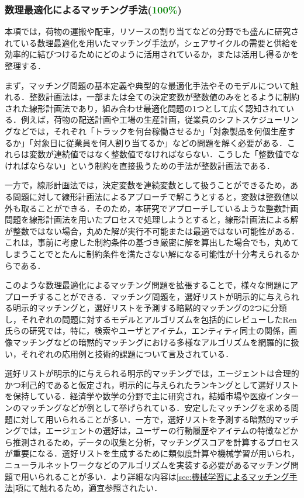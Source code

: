       \subsubsection{数理最適化によるマッチング手法(\textcolor{green}{100\%})}
        \label{sec:数理最適化によるマッチング手法}
          \par 本項では，荷物の運搬や配車，リソースの割り当てなどの分野でも盛んに研究されている数理最適化を用いたマッチング手法が，シェアサイクルの需要と供給を効率的に結びつけるためにどのように活用されているか，または活用し得るかを整理する．
          \par まず，マッチング問題の基本定義や典型的な最適化手法やそのモデルについて触れる．整数計画法は，一部または全ての決定変数が整数値のみをとるように制約された線形計画法であり，組み合わせ最適化問題の1つとして広く認知されている．例えば，荷物の配送計画や工場の生産計画，従業員のシフトスケジューリングなどでは，それぞれ「トラックを何台稼働させるか」「対象製品を何個生産するか」「対象日に従業員を何人割り当てるか」などの問題を解く必要がある．これらは変数が連続値ではなく整数値でなければならない．こうした「整数値でなければならない」という制約を直接扱うための手法が整数計画法である．
          \par 一方で，線形計画法では，決定変数を連続変数として扱うことができるため，ある問題に対して線形計画法によるアプローチで解こうとすると，変数は整数値以外も取ることができる．そのため，本研究でアプローチしているような整数計画問題を線形計画法を用いたプロセスで処理しようとすると，線形計画法による解が整数ではない場合，丸めた解が実行不可能または最適ではない可能性がある．これは，事前に考慮した制約条件の基づき厳密に解を算出した場合でも，丸めてしまうことでとたんに制約条件を満たさない解になる可能性が十分考えられるからである．
          \par このような数理最適化によるマッチング問題を拡張することで，様々な問題にアプローチすることができる．マッチング問題を，選好リストが明示的に与えられる明示的マッチングと，選好リストを予測する暗黙的マッチングの2つに分類し，それぞれの問題に対するモデルとアルゴリズムを包括的にレビューしたRen氏らの研究では，特に，検索やユーザとアイテム，エンティティ同士の関係，画像マッチングなどの暗黙的マッチングにおける多様なアルゴリズムを網羅的に扱い，それぞれの応用例と技術的課題について言及されている．
          \par 選好リストが明示的に与えられる明示的マッチングでは，エージェントは合理的かつ利己的であると仮定され，明示的に与えられたランキングとして選好リストを保持している．経済学や数学の分野で主に研究され，結婚市場や医療インターンのマッチングなどが例として挙げられている．安定したマッチングを求める問題に対して用いられることが多い．一方で，選好リストを予測する暗黙的マッチングでは，エージェントの選好は，ユーザーの行動履歴やアイテムの特徴などから推測されるため，データの収集と分析，マッチングスコアを計算するプロセスが重要になる．選好リストを生成するために類似度計算や機械学習が用いられ，ニューラルネットワークなどのアルゴリズムを実装する必要があるマッチング問題で用いられることが多い．より詳細な内容は\ref{sec:機械学習によるマッチング手法}項にて触れるため，適宜参照されたい．
